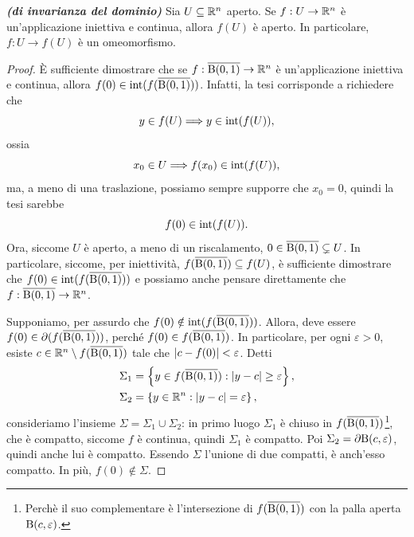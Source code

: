 \begin{teorema}\textbf{\emph{(di invarianza del dominio)}}
	Sia $U \subseteq \mathbb{R}^n$ aperto. Se $f: U \to \mathbb{R}^n$ è un'applicazione iniettiva e continua, allora $f(U)$ è aperto. In particolare, $f: U \to f(U)$ è un omeomorfismo.
\end{teorema}
\begin{proof}
	È sufficiente dimostrare che se  $f: \overline{\textup{B}(0,1)} \to \mathbb{R}^n$ è un'applicazione iniettiva e continua, allora $f(0) \in \textup{int}(f(\overline{\textup{B}(0,1)}))$. Infatti, la tesi corrisponde a richiedere che
	\[ y \in f(U) \Longrightarrow y \in \textup{int}(f(U)), \]
	ossia
	\[ x_0 \in U \Longrightarrow f(x_0) \in \textup{int}(f(U)), \]
	ma, a meno di una traslazione, possiamo sempre supporre che $x_0=0$, quindi la tesi sarebbe
	\[ f(0) \in \textup{int}(f(U)). \]
	Ora, siccome $U$ è aperto, a meno di un riscalamento, $0 \in \overline{\textup{B}(0,1)}\subsetneq U$. %
	In particolare, siccome, per iniettività, $f(\overline{\textup{B}(0,1)}) \subseteq f(U)$, è sufficiente dimostrare che $f(0) \in \textup{int}(f(\overline{\textup{B}(0,1)}))$ e possiamo anche pensare direttamente che $f: \overline{\textup{B}(0,1)} \to \mathbb{R}^n$.
	
	Supponiamo, per assurdo che $f(0) \notin \textup{int}(f(\overline{\textup{B}(0,1)}))$. Allora, deve essere $f(0) \in \partial (f(\overline{\textup{B}(0,1)}))$, perché $f(0) \in f(\overline{\textup{B}(0,1)})$. In particolare, per ogni $\varepsilon > 0$, esiste $c \in \mathbb{R}^n\setminus f(\overline{\textup{B}(0,1)})$ tale che $\lvert c-f(0)\rvert<\varepsilon$. Detti 
	\begin{align*}
		\Sigma_1 &= \left\lbrace y \in f(\overline{\textup{B}(0,1)}): \lvert y-c\rvert\ge \varepsilon\right\rbrace,\\
		\Sigma_2 &= \left\lbrace y \in \mathbb{R}^n: \lvert y-c\rvert= \varepsilon\right\rbrace,
	\end{align*}
	consideriamo l'insieme $\Sigma = \Sigma_1 \cup \Sigma_2$: in primo luogo $\Sigma_1$ è chiuso in $f(\overline{\textup{B}(0,1)})$\footnote{Perchè il suo complementare è l'intersezione di $f(\overline{\textup{B}(0,1)})$ con la palla aperta $\textup{B}(c,\varepsilon)$.}, che è compatto, siccome $f$ è continua, quindi $\Sigma_1$ è compatto. Poi $\Sigma_2 = \partial \textup{B}(c,\varepsilon)$, quindi anche lui è compatto. Essendo $\Sigma$ l'unione di due compatti, è anch'esso compatto. In più, $f(0) \notin \Sigma$.
	

\end{proof}
